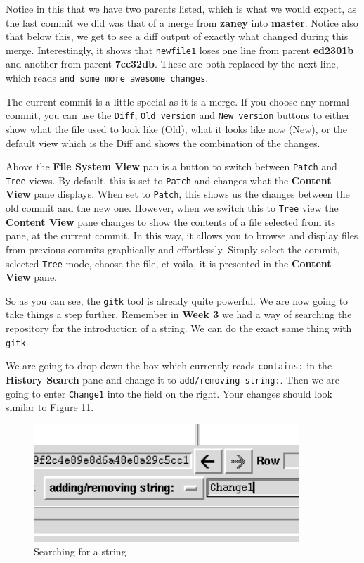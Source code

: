 Notice in this that we have two parents listed, which is what we would expect, as the last commit we did was that of a merge from \textbf{zaney} into \textbf{master}.
Notice also that below this, we get to see a diff output of exactly what changed during this merge.
Interestingly, it shows that \texttt{newfile1} loses one line from parent \textbf{ed2301b} and another from parent \textbf{7cc32db}.
These are both replaced by the next line, which reads \texttt{and some more awesome changes}.

The current commit is a little special as it is a merge.
If you choose any normal commit, you can use the \texttt{Diff}, \texttt{Old version} and \texttt{New version} buttons to either show what the file used to look like (Old), what it looks like now (New), or the default view which is the Diff and shows the combination of the changes.

Above the \textbf{File System View} pan is a button to switch between \texttt{Patch} and \texttt{Tree} views.
By default, this is set to \texttt{Patch} and changes what the \textbf{Content View} pane displays.
When set to \texttt{Patch}, this shows us the changes between the old commit and the new one.
However, when we switch this to \texttt{Tree} view the \textbf{Content View} pane changes to show the contents of a file selected from its pane, at the current commit.
In this way, it allows you to browse and display files from previous commits graphically and effortlessly.
Simply select the commit, selected \texttt{Tree} mode, choose the file, et voila, it is presented in the \textbf{Content View} pane.

So as you can see, the \texttt{gitk} tool is already quite powerful.
We are now going to take things a step further.
Remember in \textbf{Week 3} we had a way of searching the repository for the introduction of a string.
We can do the exact same thing with \texttt{gitk}.

We are going to drop down the box which currently reads \texttt{contains:} in the \textbf{History Search} pane and change it to \texttt{add/removing string:}.
Then we are going to enter \texttt{Change1} into the field on the right.
Your changes should look similar to Figure 11.

\begin{figure}[hbt]
\centering
\includegraphics[width=10cm]{images/f-w5-d11.png}
\caption{Searching for a string}
\end{figure}

